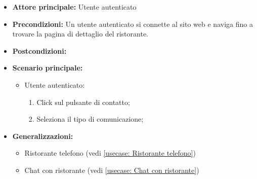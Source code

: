 \label{usecase:Contatta ristorante}
\begin{itemize}
	\item \textbf{Attore principale:}  Utente autenticato
	\item \textbf{Precondizioni:}
	      Un utente autenticato si connette al sito web e naviga fino a trovare la
	      pagina di dettaglio del ristorante.
	\item \textbf{Postcondizioni:}
	\item \textbf{Scenario principale:}
	      \begin{itemize}
		      \item  Utente autenticato:
		            \begin{enumerate}
			            \item Click sul pulsante di contatto;
			            \item Seleziona il tipo di comunicazione;
		            \end{enumerate}
	      \end{itemize}
	\item \textbf{Generalizzazioni:}
	      \begin{itemize}
		      \item  Ristorante telefono (vedi \autoref{usecase: Ristorante telefono})
		      \item  Chat con ristorante (vedi \autoref{usecase: Chat con ristorante})
	      \end{itemize}
\end{itemize}
